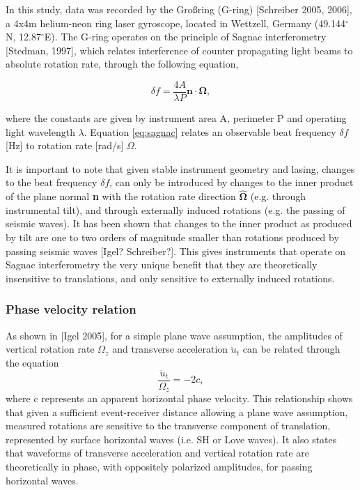 \documentclass{gji}
\begin{document}
In this study, data was recorded by the Gro\ss ring (G-ring) [Schreiber 2005, 2006], a 4x4m helium-neon ring laser gyroscope, located in Wettzell, Germany (49.144$^\circ$N, 12.87$^\circ$E). The G-ring operates on the principle of Sagnac interferometry [Stedman, 1997], which relates interference of counter propagating light beams to absolute rotation rate, through the following equation, 

\begin{equation}\label{eq:sagnac}
	\delta f = \frac{4A}{\lambda P}\mathbf{n}\cdot \mathbf{\Omega},
\end{equation}

\noindent where the constants are given by instrument area A, perimeter P and operating light wavelength $\lambda$. Equation \ref{eq:sagnac} relates an observable beat frequency $\delta f$ [Hz] to rotation rate [rad/s] $\Omega$.

It is important to note that given stable instrument geometry and lasing, changes to the beat frequency $\delta f$, can only be introduced by changes to the inner product of the plane normal {\bfseries n} with the rotation rate direction $\mathbf{\hat{\Omega}}$ (e.g. through instrumental tilt), and through externally induced rotations (e.g. the passing of seismic waves). It has been shown that changes to the inner product as produced by tilt are one to two orders of magnitude smaller than rotations produced by passing seismic waves [Igel? Schreiber?]. This gives instruments that operate on Sagnac interferometry the very unique benefit that they are theoretically insensitive to translations, and only sensitive to externally induced rotations.

\subsubsection{Phase velocity relation}\label{phasevel}
As shown in [Igel 2005], %
for a simple plane wave assumption, the amplitudes of vertical rotation rate $\Omega_z$  and transverse acceleration $\ddot{u}_t$ can be related through the equation 
\begin{equation}\label{phasevelocity}
	\frac{\ddot{u}_t}{\Omega_z} = -2c,
\end{equation}
where c represents an apparent horizontal phase velocity. This relationship shows that given a sufficient event-receiver distance allowing a plane wave assumption, measured rotations are sensitive to the transverse component of translation, represented by surface horizontal waves (i.e. SH or Love waves). It also states that waveforms of transverse acceleration and vertical rotation rate are theoretically in phase, with oppositely polarized amplitudes, for passing horizontal waves.
\end{document}
